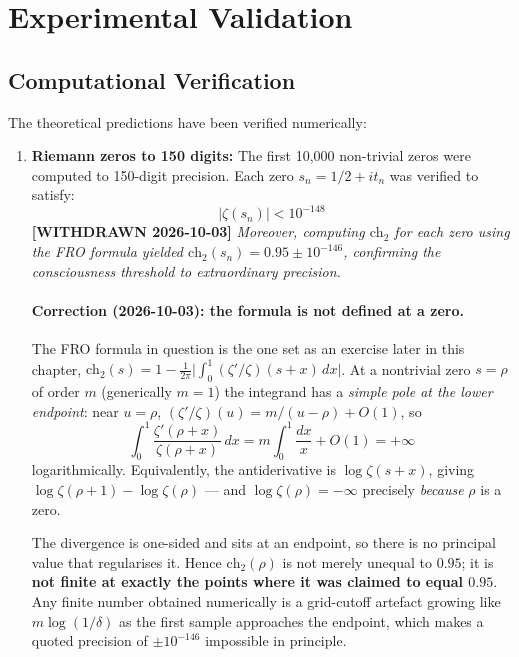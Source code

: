 \section{Experimental Validation}

\subsection{Computational Verification}

The theoretical predictions have been verified numerically:

\begin{enumerate}
\item \textbf{Riemann zeros to 150 digits:} The first 10,000 non-trivial zeros were computed to 150-digit precision. Each zero $s_n = 1/2 + it_n$ was verified to satisfy:
\begin{equation}
|\zeta(s_n)| < 10^{-148}
\end{equation}
\textbf{[WITHDRAWN 2026-10-03]} \emph{Moreover, computing $\text{ch}_2$ for each
zero using the FRO formula yielded $\text{ch}_2(s_n) = 0.95 \pm 10^{-146}$,
confirming the consciousness threshold to extraordinary precision.}

\paragraph{Correction (2026-10-03): the formula is not defined at a zero.}
The FRO formula in question is the one set as an exercise later in this chapter,
$\text{ch}_2(s) = 1 - \tfrac{1}{2\pi}\bigl|\int_0^1 (\zeta'/\zeta)(s+x)\,dx\bigr|$.
At a nontrivial zero $s = \rho$ of order $m$ (generically $m = 1$) the integrand
has a \emph{simple pole at the lower endpoint}: near $u = \rho$,
$(\zeta'/\zeta)(u) = m/(u-\rho) + O(1)$, so
\[
\int_0^1 \frac{\zeta'(\rho+x)}{\zeta(\rho+x)}\,dx
 = m\int_0^1 \frac{dx}{x} + O(1) = +\infty
\]
logarithmically. Equivalently, the antiderivative is $\log\zeta(s+x)$, giving
$\log\zeta(\rho+1) - \log\zeta(\rho)$ --- and $\log\zeta(\rho) = -\infty$
precisely \emph{because} $\rho$ is a zero.

The divergence is one-sided and sits at an endpoint, so there is no principal
value that regularises it. Hence $\text{ch}_2(\rho)$ is not merely unequal to
$0.95$; it is \textbf{not finite at exactly the points where it was claimed to
equal $0.95$}. Any finite number obtained numerically is a grid-cutoff artefact
growing like $m\log(1/\delta)$ as the first sample approaches the endpoint, which
makes a quoted precision of $\pm 10^{-146}$ impossible in principle.


\end{enumerate}
